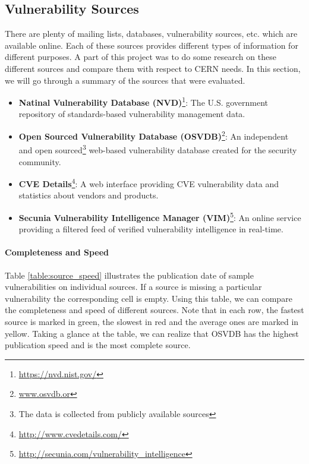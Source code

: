 \subsection{Vulnerability Sources}
\label{vuln_sources}
There are plenty of mailing lists, databases, vulnerability sources, etc. which are available online. Each of these sources provides different types of information for different purposes. A part of this project was to do some research on these different sources and compare them with respect to CERN needs. In this section, we will go through a summary of the sources that were evaluated. 
\begin{itemize}
\item \textbf{Natinal Vulnerability Database (NVD)}\footnote{\url{https://nvd.nist.gov/}}: The U.S. government repository of standards-based vulnerability management data.
\item \textbf{Open Sourced Vulnerability Database (OSVDB)}\footnote{\url{www.osvdb.or}}: An independent and open sourced\footnote{The data is collected from publicly available sources} web-based vulnerability database created for the security community. 
\item \textbf{CVE Details}\footnote{\url{http://www.cvedetails.com/}}: A web interface providing CVE vulnerability data and statistics about vendors and products.
\item \textbf{Secunia Vulnerability Intelligence Manager (VIM)}\footnote{\url{http://secunia.com/vulnerability_intelligence}}: An online service providing a filtered feed of verified vulnerability intelligence in real-time.

\end{itemize}
\paragraph{Completeness and Speed}
Table \ref{table:source_speed} illustrates the publication date of sample vulnerabilities on individual sources. If a source is missing a particular vulnerability the corresponding cell is empty. Using this table, we can compare the completeness and speed of different sources. Note that in each row, the fastest source is marked in green, the slowest in red and the average ones are marked in yellow. Taking a glance at the table, we can realize that OSVDB has the highest publication speed and is the most complete source.

